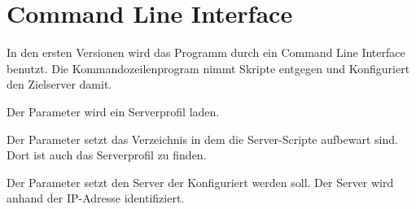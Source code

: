\section{Command Line Interface}

In den ersten Versionen wird das Programm durch ein Command Line Interface
benutzt. Die Kommandozeilenprogram nimmt Skripte entgegen und Konfiguriert den
Zielserver damit.


Der  Parameter wird ein Serverprofil laden.

\begin{asparaitem}
\item {}
\item {}
\end{asparaitem}

Der  Parameter setzt das Verzeichnis in dem die
Server-Scripte aufbewart sind. Dort ist auch das Serverprofil zu finden.

Der  Parameter setzt den Server der Konfiguriert
werden soll. Der Server wird anhand der IP-Adresse identifiziert.
